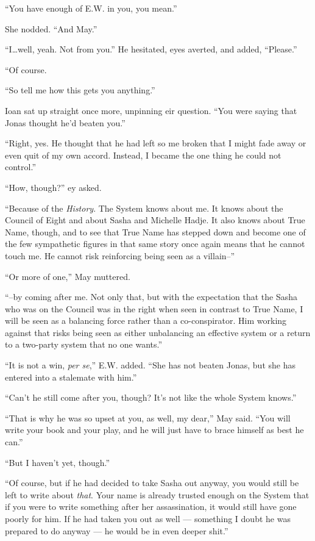 ``You have enough of E.W. in you, you mean.''

She nodded. ``And May.''

``I\ldots well, yeah. Not from you.'' He hesitated, eyes averted, and added, ``Please.''

``Of course.

``So tell me how this gets you anything.''

Ioan sat up straight once more, unpinning eir question. ``You were saying that Jonas thought he'd beaten you.''

``Right, yes. He thought that he had left so me broken that I might fade away or even quit of my own accord. Instead, I became the one thing he could not control.''

``How, though?'' ey asked.

``Because of the \emph{History}. The System knows about me. It knows about the Council of Eight and about Sasha and Michelle Hadje. It also knows about True Name, though, and to see that True Name has stepped down and become one of the few sympathetic figures in that same story once again means that he cannot touch me. He cannot risk reinforcing being seen as a villain--''

``Or more of one,'' May muttered.

``--by coming after me. Not only that, but with the expectation that the Sasha who was on the Council was in the right when seen in contrast to True Name, I will be seen as a balancing force rather than a co-conspirator. Him working against that risks being seen as either unbalancing an effective system or a return to a two-party system that no one wants.''

``It is not a win, \emph{per se},'' E.W. added. ``She has not beaten Jonas, but she has entered into a stalemate with him.''

``Can't he still come after you, though? It's not like the whole System knows.''

``That is why he was so upset at you, as well, my dear,'' May said. ``You will write your book and your play, and he will just have to brace himself as best he can.''

``But I haven't yet, though.''

``Of course, but if he had decided to take Sasha out anyway, you would still be left to write about \emph{that}. Your name is already trusted enough on the System that if you were to write something after her assassination, it would still have gone poorly for him. If he had taken you out as well — something I doubt he was prepared to do anyway — he would be in even deeper shit.''

